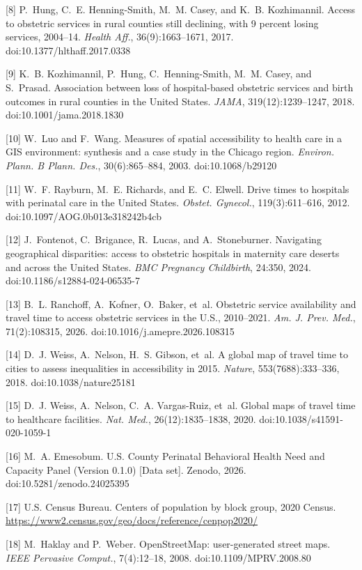 \documentclass{article}
\begin{document}
[8] P.~Hung, C.~E. Henning-Smith, M.~M. Casey, and K.~B. Kozhimannil. Access to obstetric services in rural counties still declining, with 9 percent losing services, 2004--14. \emph{Health Aff.}, 36(9):1663--1671, 2017. doi:10.1377/hlthaff.2017.0338

[9] K.~B. Kozhimannil, P.~Hung, C.~Henning-Smith, M.~M. Casey, and S.~Prasad. Association between loss of hospital-based obstetric services and birth outcomes in rural counties in the United States. \emph{JAMA}, 319(12):1239--1247, 2018. doi:10.1001/jama.2018.1830

[10] W.~Luo and F.~Wang. Measures of spatial accessibility to health care in a GIS environment: synthesis and a case study in the Chicago region. \emph{Environ. Plann. B Plann. Des.}, 30(6):865--884, 2003. doi:10.1068/b29120

[11] W.~F. Rayburn, M.~E. Richards, and E.~C. Elwell. Drive times to hospitals with perinatal care in the United States. \emph{Obstet. Gynecol.}, 119(3):611--616, 2012. doi:10.1097/AOG.0b013e318242b4cb

[12] J.~Fontenot, C.~Brigance, R.~Lucas, and A.~Stoneburner. Navigating geographical disparities: access to obstetric hospitals in maternity care deserts and across the United States. \emph{BMC Pregnancy Childbirth}, 24:350, 2024. doi:10.1186/s12884-024-06535-7

[13] B.~L. Ranchoff, A.~Kofner, O.~Baker, et~al. Obstetric service availability and travel time to access obstetric services in the U.S., 2010--2021. \emph{Am. J. Prev. Med.}, 71(2):108315, 2026. doi:10.1016/j.amepre.2026.108315

[14] D.~J. Weiss, A.~Nelson, H.~S. Gibson, et~al. A global map of travel time to cities to assess inequalities in accessibility in 2015. \emph{Nature}, 553(7688):333--336, 2018. doi:10.1038/nature25181

[15] D.~J. Weiss, A.~Nelson, C.~A. Vargas-Ruiz, et~al. Global maps of travel time to healthcare facilities. \emph{Nat. Med.}, 26(12):1835--1838, 2020. doi:10.1038/s41591-020-1059-1

[16] M.~A. Emesobum. U.S. County Perinatal Behavioral Health Need and Capacity Panel (Version 0.1.0) [Data set]. Zenodo, 2026. doi:10.5281/zenodo.24025395

[17] U.S. Census Bureau. Centers of population by block group, 2020 Census. \url{https://www2.census.gov/geo/docs/reference/cenpop2020/}

[18] M.~Haklay and P.~Weber. OpenStreetMap: user-generated street maps. \emph{IEEE Pervasive Comput.}, 7(4):12--18, 2008. doi:10.1109/MPRV.2008.80
\end{document}
